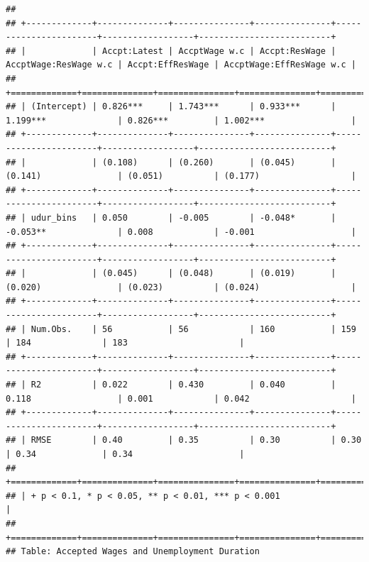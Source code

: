 \documentclass[
]{article}
\begin{document}
\begin{verbatim}
## 
## +-------------+--------------+---------------+---------------+-----------------------+------------------+--------------------------+
## |             | Accpt:Latest | AccptWage w.c | Accpt:ResWage | AccptWage:ResWage w.c | Accpt:EffResWage | AccptWage:EffResWage w.c |
## +=============+==============+===============+===============+=======================+==================+==========================+
## | (Intercept) | 0.826***     | 1.743***      | 0.933***      | 1.199***              | 0.826***         | 1.002***                 |
## +-------------+--------------+---------------+---------------+-----------------------+------------------+--------------------------+
## |             | (0.108)      | (0.260)       | (0.045)       | (0.141)               | (0.051)          | (0.177)                  |
## +-------------+--------------+---------------+---------------+-----------------------+------------------+--------------------------+
## | udur_bins   | 0.050        | -0.005        | -0.048*       | -0.053**              | 0.008            | -0.001                   |
## +-------------+--------------+---------------+---------------+-----------------------+------------------+--------------------------+
## |             | (0.045)      | (0.048)       | (0.019)       | (0.020)               | (0.023)          | (0.024)                  |
## +-------------+--------------+---------------+---------------+-----------------------+------------------+--------------------------+
## | Num.Obs.    | 56           | 56            | 160           | 159                   | 184              | 183                      |
## +-------------+--------------+---------------+---------------+-----------------------+------------------+--------------------------+
## | R2          | 0.022        | 0.430         | 0.040         | 0.118                 | 0.001            | 0.042                    |
## +-------------+--------------+---------------+---------------+-----------------------+------------------+--------------------------+
## | RMSE        | 0.40         | 0.35          | 0.30          | 0.30                  | 0.34             | 0.34                     |
## +=============+==============+===============+===============+=======================+==================+==========================+
## | + p < 0.1, * p < 0.05, ** p < 0.01, *** p < 0.001                                                                                |
## +=============+==============+===============+===============+=======================+==================+==========================+
## Table: Accepted Wages and Unemployment Duration
\end{verbatim}
\end{document}
